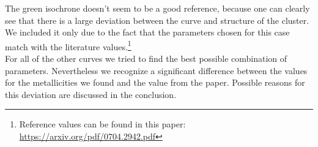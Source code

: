The green isochrone doesn't seem to be a good reference, because one can clearly see that there is a large deviation between the curve and structure of the cluster. \\
We included it only due to the fact that the parameters chosen for this case match with the literature values.\footnote{Reference values can be found in this paper:
\url{https://arxiv.org/pdf/0704.2942.pdf}} \\
For all of the other curves we tried to find the best possible combination of parameters. Nevertheless we recognize a significant difference between the values for the metallicities we found and the value from the paper. Possible reasons for this deviation are discussed in the conclusion.